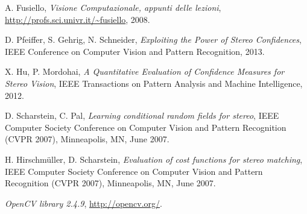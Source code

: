 \documentclass[12pt]{report}
\begin{document}
	\begin{thebibliography}{1}
		
		A. Fusiello,
		\emph{Visione Computazionale, appunti delle lezioni},
		\url{http://profs.sci.univr.it/~fusiello},
		2008.

		D. Pfeiffer, S. Gehrig, N. Schneider,
		\emph{Exploiting the Power of Stereo Confidences},
		IEEE Conference on Computer Vision and Pattern Recognition, 2013.
	
		X. Hu, P. Mordohai,
		\emph{A Quantitative Evaluation of Confidence Measures for Stereo Vision},
		IEEE Transactions on Pattern Analysis and Machine Intelligence, 2012.
		
		D. Scharstein, C. Pal,
		\emph{Learning conditional random fields for stereo},
		IEEE Computer Society Conference on Computer Vision and Pattern Recognition (CVPR 2007), Minneapolis, MN, June 2007.
		
		H. Hirschmüller, D. Scharstein,
		\emph{Evaluation of cost functions for stereo matching},
		IEEE Computer Society Conference on Computer Vision and Pattern Recognition (CVPR 2007), Minneapolis, MN, June 2007.
		
		\emph{OpenCV library 2.4.9},
		\url{http://opencv.org/}.
		
		
	\end{thebibliography}	
	
\end{document}
